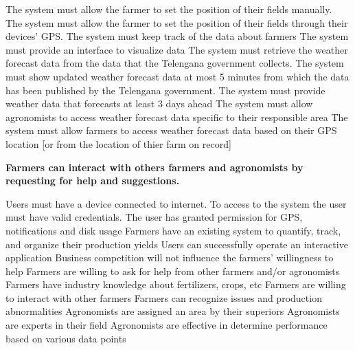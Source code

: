 \begin{itemize}
\begin{itemize}
 The system must allow the farmer to set the position of their fields manually.
 The system must allow the farmer to set the position of their fields through their devices' GPS.
 The system must keep track of the data about farmers
 The system must provide an interface to visualize data
 The system must retrieve the weather forecast data from the data that the Telengana government collects.
 The system must show updated weather forecast data at most 5 minutes from which the data has been published by the Telengana government.
 The system must provide weather data that forecasts at least 3 days ahead
 The system must allow agronomists to access weather forecast data specific to their responsible area
 The system must allow farmers to access weather forecast data based on their GPS location [or from the location of thier farm on record]

\end{itemize}

 \textbf{Farmers can interact with others farmers and agronomists by requesting for help and suggestions.}

\begin{itemize}
  Users must have a device connected to internet.
 To access to the system the user must have valid credentials.
 The user has granted permission for GPS, notifications and disk usage
 Farmers have an existing system to quantify, track, and organize their production yields
 Users can successfully operate an interactive application
 Business competition will not influence the farmers' willingness to help
 Farmers are willing to ask for help from other farmers and/or agronomists
 Farmers have industry knowledge about fertilizers, crops, etc 
 Farmers are willing to interact with other farmers 
 Farmers can recognize issues and production abnormalities
 Agronomists are assigned an area by their superiors
 Agronomists are experts in their field
 Agronomists are effective in determine performance based on various data points


\end{itemize}
\end{itemize}
